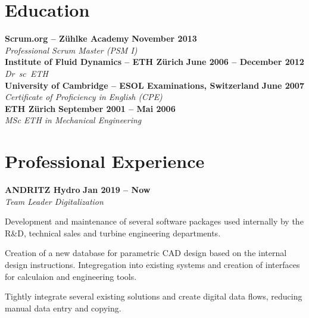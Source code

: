 \documentclass[line,11pt,a4paper]{../resume}
\begin{document}
\begin{resume}
\section{\mysidestyle Education}\vspace{2mm}

\textbf{Scrum.org -- Z\"uhlke Academy} \hfill \textbf{November 2013}%
\vspace{2mm}\\\vspace{1mm}%
\textsl{Professional Scrum Master (PSM I)}%
\vspace{2mm}\\\vspace{-1mm}%
%
\textbf{Institute of Fluid Dynamics -- ETH Z\"urich} \hfill \textbf{June 2006 -- December 2012}%
\vspace{2mm}\\\vspace{1mm}%
\textsl{Dr\ sc\ ETH}%
\vspace{2mm}\\\vspace{-1mm}%
%
\textbf{University of Cambridge -- ESOL Examinations, Switzerland} \hfill \textbf{June 2007}%
\vspace{2mm}\\\vspace{1mm}%
\textsl{Certificate of Proficiency in English (CPE)}%
\vspace{2mm}\\\vspace{-1mm}%
%
\textbf{ETH Z\"urich} \hfill \textbf{September 2001 -- Mai 2006}%
\vspace{2mm}\\\vspace{1mm}%
\textsl{MSc ETH in Mechanical Engineering}%
\vspace{-3mm}\\\vspace{-1mm}%

\section{\mysidestyle Professional Experience}\vspace{2mm}

\textbf{ANDRITZ Hydro} \hfill \textbf{Jan 2019 -- Now }
\vspace{2mm}\\\vspace{1mm}%
\textsl{Team Leader Digitalization}\\
\begin{list2}
  \item Development and maintenance of several software packages used
    internally by the R\&D, technical sales and turbine engineering
    departments.
  \item Creation of a new database for parametric CAD design based on the
    internal design instructions. Integregation into existing systems and
    creation of interfaces for calculaion and engineering tools.
  \item Tightly integrate several existing solutions and create digital
    data flows, reducing manual data entry and copying.
\end{list2}


\end{resume}
\end{document}
